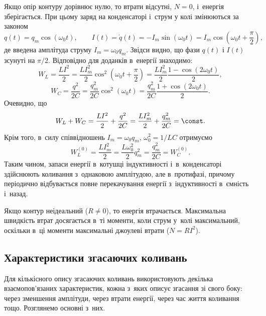 Якщо опір контуру дорівнює нулю, то втрати відсутні,
$N = 0$, і~енергія зберігається. При цьому заряд на конденсаторі і~струм у
колі змінюються за законом
\begin{equation*}
	q(t) = q_m \cos(\omega_0 t), \qquad
	I(t) = \dot{q}(t) = -I_m \sin(\omega_0 t) = I_m \cos\left(\omega_0 t + \frac{\pi}{2}\right),
\end{equation*}
де введена амплітуда струму $I_m = \omega_0 q_m$. Звідси видно, що фази $q(t)$ і
$I(t)$ зсунуті на $\pi/2$. Відповідно для доданків в~енергії знаходимо:
\begin{equation*}
	W_L = \frac{LI^2}{2} = \frac{LI_m^2}{2} \cos^2\left(\omega_0 t + \frac{\pi}{2}\right) = \frac{LI_m^2}{2} \frac{1 - \cos(2\omega_0 t)}{2},
\end{equation*}
\begin{equation*}
	W_C = \frac{q^2}{2C} = \frac{q_m^2}{2C} \cos^2(\omega_0 t) = \frac{q_m^2}{2C} \frac{1 + \cos(2\omega_0 t)}{2}.
\end{equation*}
Очевидно, що
\begin{equation*}
	W_L + W_C = \frac{LI^2}{2} + \frac{q^2}{2C} = \frac{LI_m^2}{2} + \frac{q_m^2}{2C} = \const.
\end{equation*}
Крім того, в~силу співвідношень $I_m = \omega_0 q_m$, $\omega_0^2 = 1/LC$ отримуємо
\begin{equation*}
	W_L^{(0)} = \frac{LI_m^2}{2} = \frac{L\omega_0^2}{2} q_m^2 = \frac{q_m^2}{2C} = W_C^{(0)}.
\end{equation*}
Таким чином, запаси енергії в~котушці індуктивності і~в~конденсаторі здійснюють коливання з~однаковою амплітудою, але в~протифазі,
причому періодично відбувається повне перекачування енергії з~індуктивності в~ємність і~назад.

Якщо контур неідеальний ($R \neq 0$), то енергія втрачається. Максимальна швидкість втрат досягається в~ті моменти, коли струм у~колі
максимальний, оскільки в~ці моменти максимальні джоулеві втрати
($N = RI^2$).

\subsection*{Характеристики згасаючих коливань}

Для кількісного опису згасаючих коливань використовують декілька взаємопов'язаних характеристик, кожна з~яких описує згасання зі свого боку: через зменшення амплітуди, через втрати енергії, через час життя коливання тощо. Розглянемо основні з~них.

